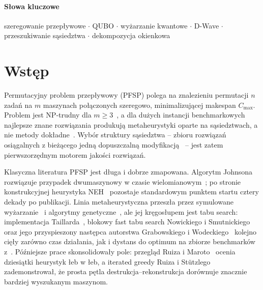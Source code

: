 \documentclass[11pt,a4paper]{article}
\begin{document}
\paragraph{Słowa kluczowe} szeregowanie przepływowe \(\cdot\) QUBO
\(\cdot\) wyżarzanie kwantowe \(\cdot\) D-Wave \(\cdot\) przeszukiwanie
sąsiedztwa \(\cdot\) dekompozycja okienkowa

\section{Wstęp}

Permutacyjny problem przepływowy (PFSP) polega na znalezieniu permutacji
$n$ zadań na $m$ maszynach połączonych szeregowo, minimalizującej
makespan $C_{\max}$. Problem jest NP-trudny dla
$m\ge3$~\citep{garey76}, a dla dużych instancji benchmarkowych najlepsze
znane rozwiązania produkują metaheurystyki oparte na sąsiedztwach, a nie
metody dokładne~\citep{bozejko2010}. Wybór struktury sąsiedztwa --
zbioru rozwiązań osiągalnych z bieżącego jedną dopuszczalną
modyfikacją~\citep{vanlaarhoven1992} -- jest zatem pierwszorzędnym
motorem jakości rozwiązań.

Klasyczna literatura PFSP jest długa i dobrze zmapowana. Algorytm
Johnsona rozwiązuje przypadek dwumaszynowy w czasie
wielomianowym~\citep{johnson54}; po stronie konstrukcyjnej heurystyka
NEH~\citep{neh83} pozostaje standardowym punktem startu cztery dekady po
publikacji. Linia metaheurystyczna przeszła przez symulowane
wyżarzanie~\citep{osman89} i algorytmy genetyczne~\citep{reeves95}, ale
jej kręgosłupem jest tabu search: implementacja
Taillarda~\citep{taillard90}, blokowy fast tabu search Nowickiego
i Smutnickiego~\citep{nowicki96} oraz jego przyspieszony następca
autorstwa Grabowskiego i Wodeckiego~\citep{grabowski04} kolejno cięły
zarówno czas działania, jak i dystans do optimum na zbiorze benchmarków
z~\citep{ref_taillard}. Późniejsze prace skonsolidowały pole: przegląd
Ruiza i Maroto~\citep{ruizmaroto05} ocenia dziesiątki heurystyk łeb
w łeb, a iterated greedy Ruiza i Stützlego~\citep{ruizstutzle07}
zademonstrował, że prosta pętla destrukcja--rekonstrukcja dorównuje
znacznie bardziej wyszukanym maszynom.
\end{document}
